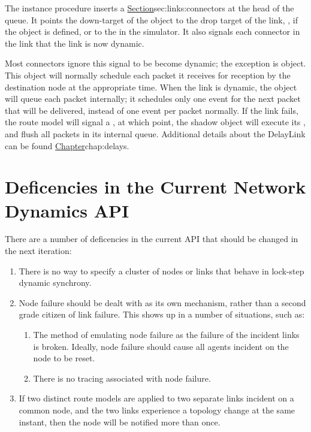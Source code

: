 The instance procedure  inserts a 
\href{DynamicLink object}{Section}{sec:links:connectors}
at the head of the queue.
It points the down-target of the object to the 
drop target of the link, , if the object is defined,
or to the  in the simulator.
It also signals each connector in the link that the link is now
dynamic.

Most connectors ignore this signal to be become dynamic;
the exception is  object.
This object will normally schedule each packet it receives
for reception by the destination node at the appropriate time.
When the link is dynamic, the object will queue each packet 
internally; it schedules only one event for the next packet
that will be delivered, instead of one event per packet normally.
If the link fails, the route model will signal a ,
at which point, the shadow object will execute its
,
and flush all packets in its internal queue.
Additional details about the DelayLink can be found
\href{in another chapter}{Chapter}{chap:delays}.

\section{Deficencies in the Current Network Dynamics API}
\label{sec:deficiencies}

There are a number of deficencies in the current API that should be
changed in the next iteration:
\begin{enumerate}
\item  There is no way to specify a cluster of nodes or links that
behave in lock-step dynamic synchrony.
\item  Node failure should be dealt with as its own mechanism,
rather than a second grade citizen of link failure.
This shows up in a number of situations, such as:
\begin{enumerate}
\item  The method of emulating node failure as the failure of the
incident links is broken.  Ideally, node failure should cause all
agents incident on the node to be reset.
\item  There is no tracing associated with node failure.
\end{enumerate}
\item  If two distinct route models are applied to two separate links
incident on a common node, and the two links experience a topology change
at the same instant, then the node will be notified more than once.
\end{enumerate}



